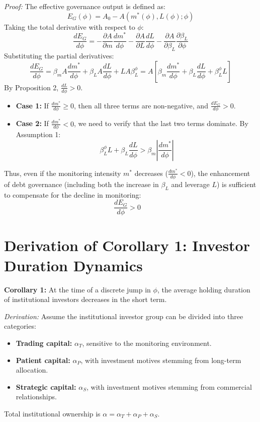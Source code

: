 \documentclass[12pt,a4paper]{article}
\begin{document}
\textit{Proof:}
The effective governance output is defined as:
\begin{equation}
E_G(\phi) = A_0 - A(m^*(\phi), L(\phi); \phi)
\end{equation}
Taking the total derivative with respect to $\phi$:
\begin{equation}
\frac{d E_G}{d \phi} = -\frac{\partial A}{\partial m} \frac{d m^*}{d \phi} - \frac{\partial A}{\partial L} \frac{d L}{d \phi} - \frac{\partial A}{\partial \beta_L} \frac{\partial \beta_L}{\partial \phi}
\end{equation}
Substituting the partial derivatives:
\begin{equation}
\frac{d E_G}{d \phi} = \beta_m A \frac{d m^*}{d \phi} + \beta_L A \frac{d L}{d \phi} + L A \beta_L^\phi = A \left[ \beta_m \frac{d m^*}{d \phi} + \beta_L \frac{d L}{d \phi} + \beta_L^\phi L \right]
\end{equation}
By Proposition 2, $\frac{d L}{d \phi} > 0$.
\begin{itemize}
    \item \textbf{Case 1:} If $\frac{d m^*}{d \phi} \ge 0$, then all three terms are non-negative, and $\frac{d E_G}{d \phi} > 0$.
    \item \textbf{Case 2:} If $\frac{d m^*}{d \phi} < 0$, we need to verify that the last two terms dominate. By Assumption 1:
    \begin{equation}
    \beta_L^\phi L + \beta_L \frac{d L}{d \phi} > \beta_m \left| \frac{d m^*}{d \phi} \right|
    \end{equation}
\end{itemize}
Thus, even if the monitoring intensity $m^*$ decreases ($\frac{d m^*}{d \phi} < 0$), the enhancement of debt governance (including both the increase in $\beta_L$ and leverage $L$) is sufficient to compensate for the decline in monitoring:
\begin{equation}
\frac{d E_G}{d \phi} > 0 \quad 
\end{equation}

\section{Derivation of Corollary 1: Investor Duration Dynamics}\label{app:G}

\textbf{Corollary 1:} At the time of a discrete jump in $\phi$, the average holding duration of institutional investors decreases in the short term.

\textit{Derivation:}
Assume the institutional investor group can be divided into three categories:
\begin{itemize}
    \item \textbf{Trading capital:} $\alpha_T$, sensitive to the monitoring environment.
    \item \textbf{Patient capital:} $\alpha_P$, with investment motives stemming from long-term allocation.
    \item \textbf{Strategic capital:} $\alpha_S$, with investment motives stemming from commercial relationships.
\end{itemize}
Total institutional ownership is $\alpha = \alpha_T + \alpha_P + \alpha_S$.
\end{document}
